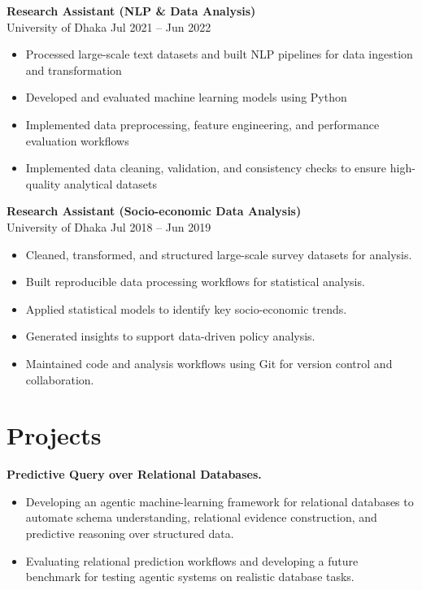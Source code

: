\documentclass[10pt, letterpaper]{article}
\begin{document}
   \textbf{Research Assistant (NLP \& Data Analysis)} \\
   University of Dhaka \hfill Jul 2021 -- Jun 2022
   \begin{itemize}
    \item Processed large-scale text datasets and built NLP pipelines for data ingestion and transformation
    \item Developed and evaluated machine learning models using Python
    \item Implemented data preprocessing, feature engineering, and performance evaluation workflows
    \item Implemented data cleaning, validation, and consistency checks to ensure high-quality analytical datasets
\end{itemize}

\textbf{Research Assistant (Socio-economic Data Analysis)} \\
University of Dhaka \hfill Jul 2018 -- Jun 2019
\begin{itemize}
    \item Cleaned, transformed, and structured large-scale survey datasets for analysis.
    \item Built reproducible data processing workflows for statistical analysis.
    \item Applied statistical models to identify key socio-economic trends.
    \item Generated insights to support data-driven policy analysis.
    \item Maintained code and analysis workflows using Git for version control and collaboration.
\end{itemize}

    
    \section*{Projects}
    \textbf{Predictive Query over Relational Databases.}
    \begin{itemize}
        \item Developing an agentic machine-learning framework for relational databases to automate schema understanding, relational evidence construction, and predictive reasoning over structured data.
        \item Evaluating relational prediction workflows and developing a future benchmark for testing agentic systems on realistic database tasks.
    \end{itemize}
\end{document}
